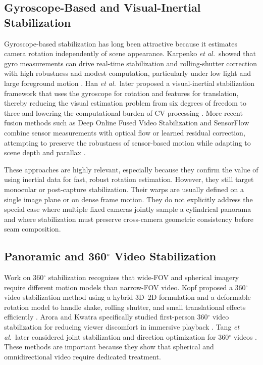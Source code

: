 \documentclass[journal]{IEEEtran}
\newcommand{\etal}{\textit{et al.}}
\begin{document}
\subsection{Gyroscope-Based and Visual-Inertial Stabilization}
Gyroscope-based stabilization has long been attractive because it estimates camera rotation independently of scene appearance. Karpenko \etal\ showed that gyro measurements can drive real-time stabilization and rolling-shutter correction with high robustness and modest computation, particularly under low light and large foreground motion \cite{karpenko2011gyro}. Han \etal\ later proposed a visual-inertial stabilization framework that uses the gyroscope for rotation and features for translation, thereby reducing the visual estimation problem from six degrees of freedom to three and lowering the computational burden of CV processing \cite{han2021tmc}. More recent fusion methods such as Deep Online Fused Video Stabilization and SensorFlow combine sensor measurements with optical flow or learned residual correction, attempting to preserve the robustness of sensor-based motion while adapting to scene depth and parallax \cite{shi2022deepfvs,yu2025sensorflow}.

These approaches are highly relevant, especially because they confirm the value of using inertial data for fast, robust rotation estimation. However, they still target monocular or post-capture stabilization. Their warps are usually defined on a single image plane or on dense frame motion. They do not explicitly address the special case where multiple fixed cameras jointly sample a cylindrical panorama and where stabilization must preserve cross-camera geometric consistency before seam composition.

\subsection{Panoramic and 360$^\circ$ Video Stabilization}
Work on 360$^\circ$ stabilization recognizes that wide-FOV and spherical imagery require different motion models than narrow-FOV video. Kopf proposed a 360$^\circ$ video stabilization method using a hybrid 3D--2D formulation and a deformable rotation model to handle shake, rolling shutter, and small translational effects efficiently \cite{kopf2016omnistab}. Arora and Kwatra specifically studied first-person 360$^\circ$ video stabilization for reducing viewer discomfort in immersive playback \cite{arora2018stab360}. Tang \etal\ later considered joint stabilization and direction optimization for 360$^\circ$ videos \cite{tang2018joint360}. These methods are important because they show that spherical and omnidirectional video require dedicated treatment.
\end{document}
